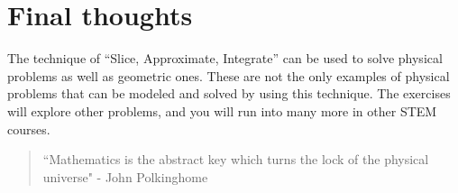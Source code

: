 \documentclass{ximera}
\begin{document}
%
%      
%        
%        
%        
\section{Final thoughts}
The technique of ``Slice, Approximate, Integrate'' can be used to solve physical problems as well as geometric ones.  These are not the only examples of physical problems that can be modeled and solved by using this technique.  The exercises will explore other problems, and you will run into many more in other STEM courses.

\begin{quote}
``Mathematics is the abstract key which turns the lock of the physical universe" - John Polkinghome
\end{quote}
\end{document}
